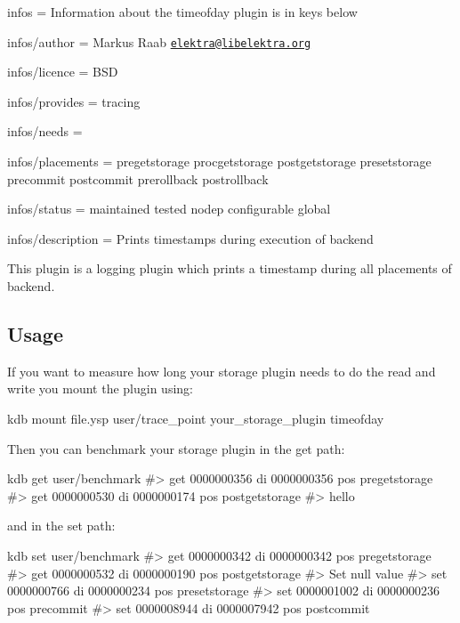 
\begin{DoxyItemize}
\item infos = Information about the timeofday plugin is in keys below
\item infos/author = Markus Raab \href{mailto:elektra@libelektra.org}{\tt elektra@libelektra.\+org}
\item infos/licence = B\+SD
\item infos/provides = tracing
\item infos/needs =
\item infos/placements = pregetstorage procgetstorage postgetstorage presetstorage precommit postcommit prerollback postrollback
\item infos/status = maintained tested nodep configurable global
\item infos/description = Prints timestamps during execution of backend
\end{DoxyItemize}

This plugin is a logging plugin which prints a timestamp during all placements of backend.

\subsection*{Usage}

If you want to measure how long your storage plugin needs to do the read and write you mount the plugin using\+:


\begin{DoxyCode}
kdb mount file.ysp user/trace\_point your\_storage\_plugin timeofday
\end{DoxyCode}


Then you can benchmark your storage plugin in the get path\+:


\begin{DoxyCode}
kdb get user/benchmark
#> get     0000000356      di      0000000356      pos     pregetstorage
#> get     0000000530      di      0000000174      pos     postgetstorage
#> hello
\end{DoxyCode}


and in the set path\+:


\begin{DoxyCode}
kdb set user/benchmark
#> get     0000000342      di      0000000342      pos     pregetstorage
#> get     0000000532      di      0000000190      pos     postgetstorage
#> Set null value
#> set     0000000766      di      0000000234      pos     presetstorage
#> set     0000001002      di      0000000236      pos     precommit
#> set     0000008944      di      0000007942      pos     postcommit
\end{DoxyCode}


